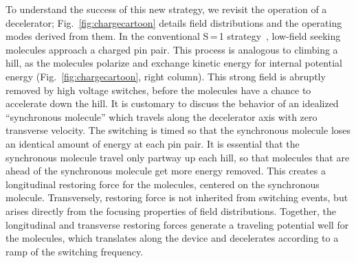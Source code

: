 \documentclass[%
 reprint,
 amsmath,amssymb,
 aps,
prl,
]{revtex4-1}
\begin{document}
To understand the success of this new strategy, we revisit the operation of a decelerator; Fig.~\ref{fig:chargecartoon} details field distributions and the operating modes derived from them.
In the conventional S\,=\,1 strategy~\cite{VanDeMeerakker2012}, low-field seeking molecules approach a charged pin pair. 
This process is analogous to climbing a hill, as the molecules polarize and exchange kinetic energy for internal potential energy (Fig.~\ref{fig:chargecartoon}, right column).
This strong field is abruptly removed by high voltage switches, before the molecules have a chance to accelerate down the hill.
It is customary to discuss the behavior of an idealized ``synchronous molecule'' which travels along the decelerator axis with zero transverse velocity.
The switching is timed so that the synchronous molecule loses an identical amount of energy at each pin pair.
It is essential that the synchronous molecule travel only partway up each hill, so that molecules that are ahead of the synchronous molecule get more energy removed.
This creates a longitudinal restoring force for the molecules, centered on the synchronous molecule.
Transversely, restoring force is not inherited from switching events, but arises directly from the focusing properties of field distributions.
Together, the longitudinal and transverse restoring forces generate a traveling potential well for the molecules, which translates along the device and decelerates according to a ramp of the switching frequency.
\end{document}
